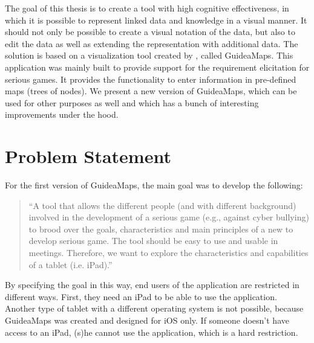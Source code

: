 The goal of this thesis is to create a tool with high cognitive effectiveness, in which it is possible to represent linked data and knowledge in a visual manner. It should not only be possible to create a visual notation of the data, but also to edit the data as well as extending the representation with additional data. The solution is based on a visualization tool created by \cite{erikjanssens}, called GuideaMaps. This application was mainly built to provide support for the requirement elicitation for serious games. It provides the functionality to enter information in pre-defined maps (trees of nodes). We present a new version of GuideaMaps, which can be used for other purposes as well and which has a bunch of interesting improvements under the hood.





\section{Problem Statement}\label{sec:problem-statement}
For the first version of GuideaMaps, the main goal was to develop the following:

\begin{quote}
``A tool that allows the different people (and with different background) involved in the development of a serious game (e.g., against cyber bullying) to brood over the goals, characteristics and main principles of a new to develop serious game. The tool should be easy to use and usable in meetings. Therefore, we want to explore the characteristics and capabilities of a tablet (i.e. iPad).'' \hfill \citep{erikjanssens}
\end{quote}

By specifying the goal in this way, end users of the application are restricted in different ways. First, they need an iPad to be able to use the application. Another type of tablet with a different operating system is not possible, because GuideaMaps was created and designed for iOS only. If someone doesn't have access to an iPad, (s)he cannot use the application, which is a hard restriction.\\

